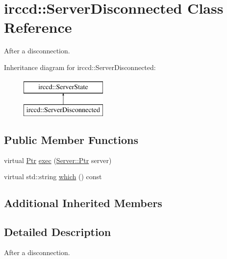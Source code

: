 \hypertarget{a00058}{\section{irccd\-:\-:Server\-Disconnected Class Reference}
\label{a00058}
}


After a disconnection.  


Inheritance diagram for irccd\-:\-:Server\-Disconnected\-:\begin{figure}[H]
\begin{center}
\leavevmode
\includegraphics[height=2.000000cm]{a00058}
\end{center}
\end{figure}
\subsection*{Public Member Functions}
\begin{DoxyCompactItemize}
\item 
virtual \hyperlink{a00060_aa1d1595a1abc377d310f06145103d7d3}{Ptr} \hyperlink{a00058_a88588e1ae97a8c2a57e0ebd9f0eb4f75}{exec} (\hyperlink{a00055_aea3f9694df81348b909814ac6f84f874}{Server\-::\-Ptr} server)
\begin{DoxyCompactList}\small\item\em \end{DoxyCompactList}\item 
virtual std\-::string \hyperlink{a00058_a35cc8acd4560c37be3cb4b48c2d58d4b}{which} () const 
\begin{DoxyCompactList}\small\item\em \end{DoxyCompactList}\end{DoxyCompactItemize}
\subsection*{Additional Inherited Members}


\subsection{Detailed Description}
After a disconnection. 

